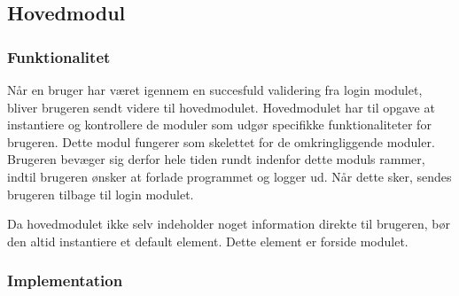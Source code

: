 \subsection{Hovedmodul}
\label{sub:hovedmodul}

\subsubsection{Funktionalitet}
\label{ssub:hovedmodul_funktionalitet}


Når en bruger har været igennem en succesfuld validering fra login modulet, bliver brugeren sendt videre til hovedmodulet. Hovedmodulet har til opgave at instantiere og kontrollere de moduler som udgør specifikke funktionaliteter for brugeren. Dette modul fungerer som skelettet for de omkringliggende moduler. Brugeren bevæger sig derfor hele tiden rundt indenfor dette moduls rammer, indtil brugeren ønsker at forlade programmet og logger ud. Når dette sker, sendes brugeren tilbage til login modulet. 

Da hovedmodulet ikke selv indeholder noget information direkte til brugeren, bør den altid instantiere et default element. Dette element er forside modulet.

\subsubsection{Implementation}
\label{ssub:hovedmodul_implementation}

